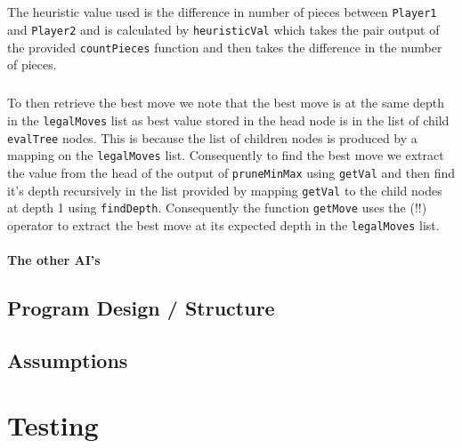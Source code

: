 \documentclass[11pt]{article}
\begin{document}
\subparagraph*{}The heuristic value used is the difference in number of pieces between \verb|Player1| and \verb|Player2| and is calculated by \verb|heuristicVal| which takes the pair output of the provided \verb|countPieces| function and then takes the difference in the number of pieces.

\subparagraph*{}To then retrieve the best move we note that the best move is at the same depth in the \verb|legalMoves| list as best value stored in the head node is in the list of child \verb|evalTree| nodes. This is because the list of children nodes is produced by a mapping on the \verb|legalMoves| list. Consequently to find the best move we extract the value from the head of the output of \verb|pruneMinMax| using \verb|getVal| and then find it's depth recursively in the list provided by mapping \verb|getVal| to the child nodes at depth 1 using \verb|findDepth|. Consequently the function \verb|getMove| uses the (!!) operator to extract the best move at its expected depth in the \verb|legalMoves| list.


\paragraph{The other AI's} 

\newpage
\subsection{Program Design / Structure}


 \subsection{Assumptions}%



\section{Testing}%
\end{document}
